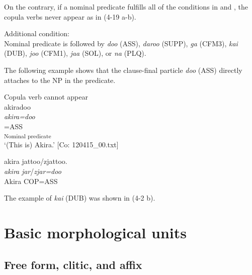   On the contrary, if a nominal predicate fulfills all of the conditions in  and , the copula verbs never appear as in (4-19 a-b).

\ea  Additional condition: \label{ex:4.18}\\
  Nominal predicate is followed by \textit{doo} (ASS), \textit{daroo} (SUPP), \textit{ga} (CFM3), \textit{kai} (DUB), \textit{joo} (CFM1), \textit{jaa} (SOL), or \textit{na} (PLQ).
\z

The following example shows that the clause-final particle \textit{doo} (ASS) directly attaches to the NP in the predicate.

\ea  Copula verb cannot appear \label{ex:4.19}
\ea{}\\
\gllll   akiradoo\\
      \textit{akira=doo}\\
      [Akira]=ASS\\
      [NP]\textsubscript{Nominal predicate}\\
      \glt       ‘(This is) Akira.’ [Co: 120415\_00.txt]

\ex  %
\glll *akira  jattoo/zjattoo.\\
      \textit{akira}  \textit{jar}/\textit{zjar=doo}\\
      Akira  COP=ASS\\
\glt    [El: 111104]
\z
\z

The example of \textit{kai} (DUB) was shown in (4-2 b).

\section{Basic morphological units}\label{sec:4.2}
\subsection{Free form, clitic, and affix}\label{sec:4.2.1}

